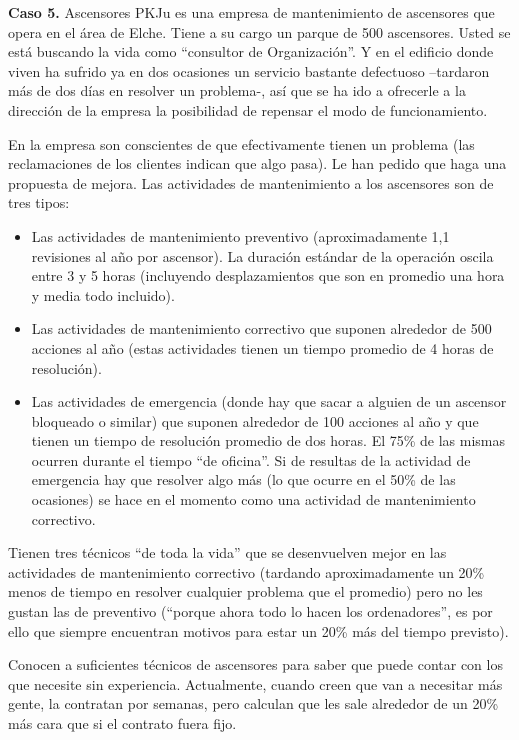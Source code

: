\documentclass[
]{book}
\providecommand{\tightlist}{%
  \setlength{\itemsep}{0pt}\setlength{\parskip}{0pt}}
\theoremstyle{definition}
\theoremstyle{definition}
\theoremstyle{definition}
\theoremstyle{definition}
\theoremstyle{remark}
\begin{document}
\textbf{Caso 5.} Ascensores PKJu es una empresa de mantenimiento de ascensores que opera en el área de Elche. Tiene a su cargo un parque de 500 ascensores. Usted se está buscando la vida como ``consultor de Organización''. Y en el edificio donde viven ha sufrido ya en dos ocasiones un servicio bastante defectuoso
--tardaron más de dos días en resolver un problema-, así que se ha ido a ofrecerle a la dirección de la empresa la posibilidad de repensar el modo de funcionamiento.

En la empresa son conscientes de que efectivamente tienen un problema (las reclamaciones de los clientes indican que algo pasa). Le han pedido que haga una propuesta de mejora. Las actividades de mantenimiento a los ascensores son de tres tipos:

\begin{itemize}
\tightlist
\item
  Las actividades de mantenimiento preventivo (aproximadamente 1,1 revisiones al año por ascensor). La duración estándar de la operación oscila entre 3 y 5 horas (incluyendo desplazamientos que son en promedio una hora y media todo incluido).
\item
  Las actividades de mantenimiento correctivo que suponen alrededor de 500 acciones al año (estas actividades tienen un tiempo promedio de 4 horas de resolución).
\item
  Las actividades de emergencia (donde hay que sacar a alguien de un ascensor bloqueado o similar) que suponen alrededor de 100 acciones al año y que tienen un tiempo de resolución promedio de dos horas. El 75\% de las mismas ocurren durante el tiempo ``de oficina''. Si de resultas de la actividad de emergencia hay que resolver algo más (lo que ocurre en el 50\% de las ocasiones) se hace en el momento como una
  actividad de mantenimiento correctivo.
\end{itemize}

Tienen tres técnicos ``de toda la vida'' que se desenvuelven mejor en las actividades de mantenimiento correctivo (tardando aproximadamente un 20\% menos de tiempo en resolver cualquier problema que el promedio) pero no les gustan las de preventivo (``porque ahora todo lo hacen los ordenadores'', es por ello
que siempre encuentran motivos para estar un 20\% más del tiempo previsto).

Conocen a suficientes técnicos de ascensores para saber que puede contar con los que necesite sin experiencia. Actualmente, cuando creen que van a necesitar más gente, la contratan por semanas, pero calculan que les sale alrededor de un 20\% más cara que si el contrato fuera fijo.
\end{document}
